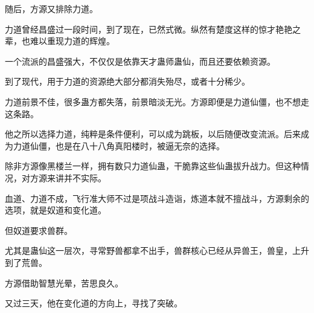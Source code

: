 \begin{this_body}
随后，方源又排除力道。

力道曾经昌盛过一段时间，到了现在，已然式微。纵然有楚度这样的惊才艳艳之辈，也难以重现力道的辉煌。

一个流派的昌盛强大，不仅仅是依靠天才蛊师蛊仙，而且还要依赖资源。

到了现代，用于力道的资源绝大部分都消失殆尽，或者十分稀少。

力道前景不佳，很多蛊方都失落，前景暗淡无光。方源即便是力道仙僵，也不想走这条路。

他之所以选择力道，纯粹是条件便利，可以成为跳板，以后随便改变流派。后来成为力道仙僵，也是在八十八角真阳楼时，被逼无奈的选择。

除非方源像黑楼兰一样，拥有数只力道仙蛊，干脆靠这些仙蛊拔升战力。但这种情况，对方源来讲并不实际。

血道、力道不成，飞行准大师不过是项战斗造诣，炼道本就不擅战斗，方源剩余的选项，就是奴道和变化道。

但奴道要求兽群。

尤其是蛊仙这一层次，寻常野兽都拿不出手，兽群核心已经从异兽王，兽皇，上升到了荒兽。

方源借助智慧光晕，苦思良久。

又过三天，他在变化道的方向上，寻找了突破。

\end{this_body}

